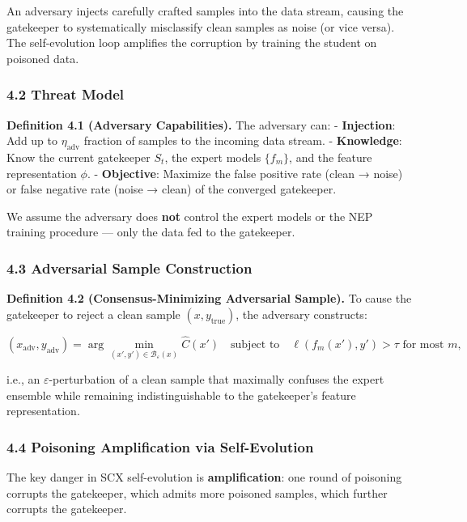 \documentclass[
  12pt,
]{article}
\begin{document}
An adversary injects carefully crafted samples into the data stream,
causing the gatekeeper to systematically misclassify clean samples as
noise (or vice versa). The self-evolution loop amplifies the corruption
by training the student on poisoned data.

\subsubsection{4.2 Threat Model}\label{threat-model}

\textbf{Definition 4.1 (Adversary Capabilities).} The adversary can: -
\textbf{Injection}: Add up to \(\eta_{\text{adv}}\) fraction of samples
to the incoming data stream. - \textbf{Knowledge}: Know the current
gatekeeper \(S_t\), the expert models \(\{f_m\}\), and the feature
representation \(\phi\). - \textbf{Objective}: Maximize the false
positive rate (clean → noise) or false negative rate (noise → clean) of
the converged gatekeeper.

We assume the adversary does \textbf{not} control the expert models or
the NEP training procedure --- only the data fed to the gatekeeper.

\subsubsection{4.3 Adversarial Sample
Construction}\label{adversarial-sample-construction}

\textbf{Definition 4.2 (Consensus-Minimizing Adversarial Sample).} To
cause the gatekeeper to reject a clean sample \((x, y_{\text{true}})\),
the adversary constructs:

\[(x_{\text{adv}}, y_{\text{adv}}) = \arg\min_{(x',y') \in \mathcal{B}_\varepsilon(x)} \hat{C}(x') \quad \text{subject to} \quad \ell(f_m(x'), y') > \tau \text{ for most } m,\]

i.e., an \(\varepsilon\)-perturbation of a clean sample that maximally
confuses the expert ensemble while remaining indistinguishable to the
gatekeeper's feature representation.

\subsubsection{4.4 Poisoning Amplification via
Self-Evolution}\label{poisoning-amplification-via-self-evolution}

The key danger in SCX self-evolution is \textbf{amplification}: one
round of poisoning corrupts the gatekeeper, which admits more poisoned
samples, which further corrupts the gatekeeper.
\end{document}
